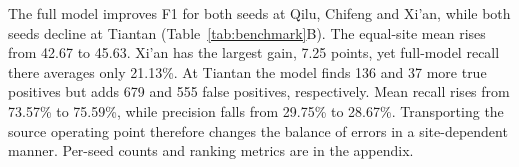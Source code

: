 The full model improves F1 for both seeds at Qilu, Chifeng and Xi'an, while both seeds decline at Tiantan (Table~\ref{tab:benchmark}B). The equal-site mean rises from 42.67 to 45.63. Xi'an has the largest gain, 7.25 points, yet full-model recall there averages only 21.13\%. At Tiantan the model finds 136 and 37 more true positives but adds 679 and 555 false positives, respectively. Mean recall rises from 73.57\% to 75.59\%, while precision falls from 29.75\% to 28.67\%. Transporting the source operating point therefore changes the balance of errors in a site-dependent manner. Per-seed counts and ranking metrics are in the appendix.
